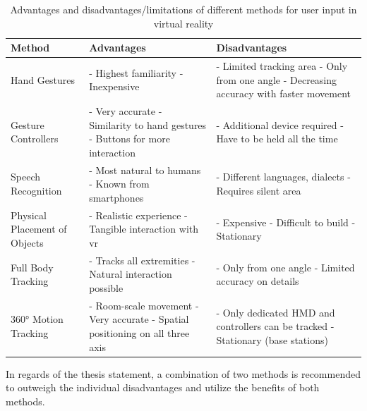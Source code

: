 \begin{table}[h]
	\begin{center}
		\begin{tabular}{ | p{3.7cm} | p{4.9cm} | p{4.9cm} | } 
			\hline
			\textbf{Method} & \textbf{Advantages} & \textbf{Disadvantages} \\
			\hline
			Hand Gestures & 
			- Highest familiarity \newline - Inexpensive & 
			- Limited tracking area \newline - Only from one angle \newline - Decreasing accuracy with faster movement  \\
			\hline
			Gesture Controllers &
			- Very accurate \newline - Similarity to hand gestures \newline - Buttons for more interaction &
			- Additional device required \newline - Have to be held all the time \\
			\hline
			Speech Recognition &
			- Most natural to humans \newline - Known from smartphones &
			- Different languages, dialects \newline - Requires silent area \\ 
			\hline
			Physical Placement of Objects &
			- Realistic experience \newline - Tangible interaction with \gls{vr} &
			- Expensive \newline - Difficult to build \newline - Stationary \\ 
			\hline
			Full Body Tracking &
			- Tracks all extremities \newline - Natural interaction possible &
			- Only from one angle \newline - Limited accuracy on details \\ 
			\hline
			360° Motion Tracking &
			- Room-scale movement \newline - Very accurate \newline - Spatial positioning on all three axis &
			- Only dedicated HMD and controllers can be tracked \newline - Stationary (base stations) \\ 
			\hline
		\end{tabular}
		\caption{Advantages and disadvantages/limitations of different methods for user input in virtual reality}
		\label{tbl:methodscomparison}
	\end{center}
\end{table} \newline
In regards of the thesis statement, a combination of two methods is recommended to outweigh the individual disadvantages and utilize the benefits of both methods.


